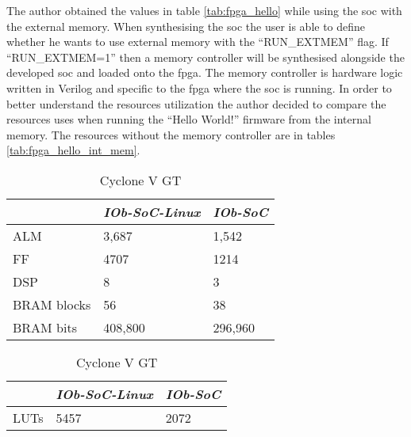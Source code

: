 The author obtained the values in table \ref{tab:fpga_hello} while using the \acrshort{soc} with the external memory. When synthesising the \acrshort{soc} the user is able to define whether he wants to use external memory with the \enquote{RUN\_EXTMEM} flag. If \enquote{RUN\_EXTMEM=1} then a memory controller will be synthesised alongside the developed \acrshort{soc} and loaded onto the \acrshort{fpga}. The memory controller is hardware logic written in Verilog and specific to the \acrshort{fpga} where the \acrshort{soc} is running. In order to better understand the resources utilization the author decided to compare the resources uses when running the \enquote{Hello World!} firmware from the internal memory. The resources without the memory controller are in tables \ref{tab:fpga_hello_int_mem}.

\begin{table}[!ht]
    \begin{subtable}[h]{0.45\textwidth}
        \centering
        \begin{tabular}{l|l|l|}
            \cline{2-3}
                                              & \textit{IOb-SoC-Linux} & \textit{IOb-SoC} \\ \hline
            \multicolumn{1}{|l|}{ALM}         & 3,687                  & 1,542            \\ \hline
            \multicolumn{1}{|l|}{FF}          & 4707                   & 1214             \\ \hline
            \multicolumn{1}{|l|}{DSP}         & 8                      & 3                \\ \hline
            \multicolumn{1}{|l|}{BRAM blocks} & 56                     & 38               \\ \hline
            \multicolumn{1}{|l|}{BRAM bits}   & 408,800                & 296,960          \\ \hline
        \end{tabular}
       \caption{Cyclone V GT}
       \label{tab:cyclone_hello_int_mem}
    \end{subtable}
    \hfill
    \begin{subtable}[h]{0.45\textwidth}
        \centering
        \begin{tabular}{l|l|l|}
            \cline{2-3}
                                            & \textit{IOb-SoC-Linux} & \textit{IOb-SoC} \\ \hline
            \multicolumn{1}{|l|}{LUTs}      & 5457                   & 2072             \\ \hline

\end{tabular}
\end{subtable}
\end{table}
